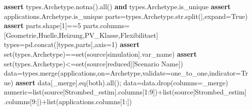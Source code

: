 \documentclass[
  ngerman,
  a4paper,
  DIV=11]{scrreprt}
\newenvironment{Shaded}{\begin{snugshade}}{\end{snugshade}}
\newcommand{\BuiltInTok}[1]{\textcolor[rgb]{0.00,0.23,0.31}{#1}}
\newcommand{\ControlFlowTok}[1]{\textcolor[rgb]{0.00,0.23,0.31}{\textbf{#1}}}
\newcommand{\DecValTok}[1]{\textcolor[rgb]{0.68,0.00,0.00}{#1}}
\newcommand{\KeywordTok}[1]{\textcolor[rgb]{0.00,0.23,0.31}{\textbf{#1}}}
\newcommand{\NormalTok}[1]{\textcolor[rgb]{0.00,0.23,0.31}{#1}}
\newcommand{\OperatorTok}[1]{\textcolor[rgb]{0.37,0.37,0.37}{#1}}
\newcommand{\StringTok}[1]{\textcolor[rgb]{0.13,0.47,0.30}{#1}}
\newcommand{\VariableTok}[1]{\textcolor[rgb]{0.07,0.07,0.07}{#1}}
\begin{document}
\begin{Shaded}
\begin{Highlighting}[]
\ControlFlowTok{assert}\NormalTok{ types.Archetype.notna().}\BuiltInTok{all}\NormalTok{() }\KeywordTok{and}\NormalTok{ types.Archetype.is\_unique}
\ControlFlowTok{assert}\NormalTok{ applications.Archetype.is\_unique}
\NormalTok{parts}\OperatorTok{=}\NormalTok{types.Archetype.}\BuiltInTok{str}\NormalTok{.split(}\StringTok{\textquotesingle{}|\textquotesingle{}}\NormalTok{,expand}\OperatorTok{=}\VariableTok{True}\NormalTok{)}
\ControlFlowTok{assert}\NormalTok{ parts.shape[}\DecValTok{1}\NormalTok{]}\OperatorTok{==}\DecValTok{5}
\NormalTok{parts.columns}\OperatorTok{=}\NormalTok{[}\StringTok{\textquotesingle{}Geometrie\textquotesingle{}}\NormalTok{,}\StringTok{\textquotesingle{}Huelle\textquotesingle{}}\NormalTok{,}\StringTok{\textquotesingle{}Heizung\textquotesingle{}}\NormalTok{,}\StringTok{\textquotesingle{}PV\_Klasse\textquotesingle{}}\NormalTok{,}\StringTok{\textquotesingle{}Flexibilitaet\textquotesingle{}}\NormalTok{]}
\NormalTok{types}\OperatorTok{=}\NormalTok{pd.concat([types,parts],axis}\OperatorTok{=}\DecValTok{1}\NormalTok{)}
\ControlFlowTok{assert} \BuiltInTok{set}\NormalTok{(types.Archetype)}\OperatorTok{==}\BuiltInTok{set}\NormalTok{(source[}\StringTok{\textquotesingle{}simulation\textquotesingle{}}\NormalTok{].var\_name)}
\ControlFlowTok{assert} \BuiltInTok{set}\NormalTok{(types.Archetype)}\OperatorTok{\textless{}=}\BuiltInTok{set}\NormalTok{(source[}\StringTok{\textquotesingle{}reduced\textquotesingle{}}\NormalTok{][}\StringTok{\textquotesingle{}Scenario Name\textquotesingle{}}\NormalTok{])}
\NormalTok{data}\OperatorTok{=}\NormalTok{types.merge(applications,on}\OperatorTok{=}\StringTok{\textquotesingle{}Archetype\textquotesingle{}}\NormalTok{,validate}\OperatorTok{=}\StringTok{\textquotesingle{}one\_to\_one\textquotesingle{}}\NormalTok{,indicator}\OperatorTok{=}\VariableTok{True}\NormalTok{)}
\ControlFlowTok{assert}\NormalTok{ data[}\StringTok{\textquotesingle{}\_merge\textquotesingle{}}\NormalTok{].eq(}\StringTok{\textquotesingle{}both\textquotesingle{}}\NormalTok{).}\BuiltInTok{all}\NormalTok{()}\OperatorTok{;}\NormalTok{ data}\OperatorTok{=}\NormalTok{data.drop(columns}\OperatorTok{=}\StringTok{\textquotesingle{}\_merge\textquotesingle{}}\NormalTok{)}
\NormalTok{numeric}\OperatorTok{=}\BuiltInTok{list}\NormalTok{(source[}\StringTok{\textquotesingle{}Strombed\_estim\textquotesingle{}}\NormalTok{].columns[}\DecValTok{1}\NormalTok{:}\DecValTok{9}\NormalTok{])}\OperatorTok{+}\BuiltInTok{list}\NormalTok{(source[}\StringTok{\textquotesingle{}Strombed\_estim\textquotesingle{}}\NormalTok{].columns[}\DecValTok{9}\NormalTok{:])}\OperatorTok{+}\BuiltInTok{list}\NormalTok{(applications.columns[}\DecValTok{1}\NormalTok{:])}

\end{Highlighting}
\end{Shaded}
\end{document}
